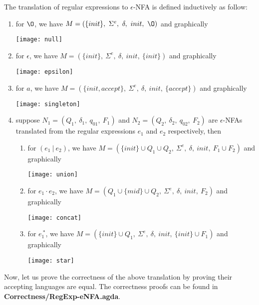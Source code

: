 \begin{defn}
\label{defn:thompson}
\noindent The translation of regular expressions
to \(\epsilon\)-NFA is defined inductively as follow:
\begin{enumerate}[nolistsep]
  \item for \(\O\), we have \(M = (\{init\},\ \Sigma^e,\ \delta,\
    init,\ \O)\) and graphically \begin{center}\texttt{[image: null]}\end{center}
  \item for \(\epsilon\), we have \(M = (\{init\},\ \Sigma^e,\
    \delta,\ init,\ \{init\})\) and graphically \begin{center}\texttt{[image: epsilon]}\end{center}
  \item for \(a\), we have \(M = (\{init, accept\},\ \Sigma^e,\
    \delta,\ init,\ \{accept\})\) and graphically \begin{center}\texttt{[image: singleton]}\end{center}
  \item suppose \(N_1 = (Q_1,\ \delta_1,\ q_{01},\ F_1)\) and \(N_2 =
    (Q_2,\ \delta_2,\ q_{02},\ F_2)\) are \(\epsilon\)-NFAs translated from the
    regular expressions \(e_1\) and \(e_2\) respectively, then
    \begin{enumerate}[nolistsep]
      \item for \((e_1\ |\ e_2)\), we have \(M = (\{init\} \cup Q_1
        \cup Q_2,\ \Sigma^e,\ \delta,\ init,\ F_1 \cup F_2)\) and
        graphically \begin{center}\texttt{[image: union]}\end{center}
      \item for \(e_1\cdot e_2\), we have \(M = (Q_1 \cup \{mid\}
        \cup Q_2,\ \Sigma^e,\ \delta,\ init,\ F_2)\) and graphically \begin{center}\texttt{[image: concat]}\end{center}
      \item for \(e_1^{\ *}\), we have \(M = (\{init\} \cup Q_1,\
        \Sigma^e,\ \delta,\ init,\ \{init\} \cup F_1)\) and
        graphically \begin{center}\texttt{[image: star]}\end{center}
     \end{enumerate}
\end{enumerate}
\end{defn}

\par Now, let us prove the correctness of the above translation by
proving their accepting languages are equal. The correctness proofs
can be found in \textbf{Correctness/RegExp-eNFA.agda}. 

